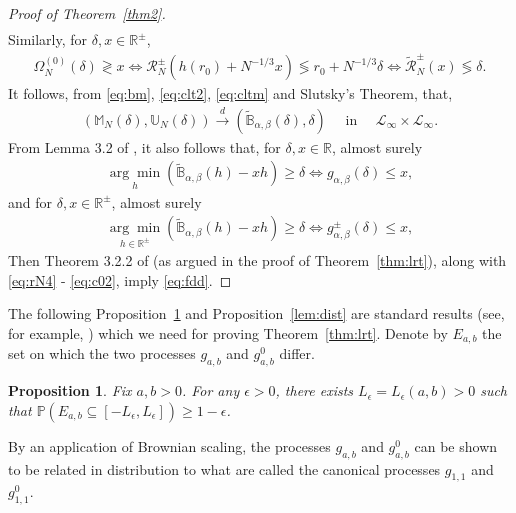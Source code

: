 \documentclass[12pt]{amsart}
\theoremstyle{plain}
\newtheorem{proposition}[theorem]{Proposition}
\theoremstyle{remark}
\numberwithin{equation}{section}
\begin{document}
\begin{proof}[Proof of Theorem~\ref{thm2}]
\begin{align}
\end{align}
Similarly, for $\delta, x \in \mathbb{R}^{\pm}$,
\begin{align}\label{eq:rN5}
    \Omega_{N}^{(0)}(\delta) \gtrless x \iff \mathcal{R}^{\pm}_N\left(h(r_0) + N^{-1/3}x\right) \lessgtr r_0 + N^{-1/3}\delta \iff \widetilde{\mathcal{R}}^{\pm}_N(x)\lessgtr \delta.
\end{align}
It follows, from \eqref{eq:bm}, \eqref{eq:clt2}, \eqref{eq:cltm} and Slutsky's Theorem,  that, 
\begin{align}\label{eq:c1}
    \left(\mathbb{M}_{N}(\delta), \mathbb{U}_{N}(\delta)\right) \stackrel{d}{\to} (\widetilde{\mathbb{B}}_{\alpha, \beta}(\delta), \delta) \quad \text { in } \quad \mathcal{L}_\infty \times \mathcal{L}_\infty.
\end{align}  
From Lemma 3.2 of \cite{MR3445293}, it also follows that, for $\delta, x \in \mathbb{R}$, almost surely
\begin{align}\label{eq:c01}
   \underset{h}{\operatorname{arg}\operatorname{min}} \left(\widetilde{\mathbb{B}}_{\alpha, \beta}(h) - xh\right) \geq \delta \iff g_{\alpha, \beta}(\delta) \leq x, 
\end{align}
and for $\delta, x \in \mathbb{R}^{\pm}$, almost surely
\begin{align}\label{eq:c02}
   \underset{h \in \mathbb{R}^{\pm}}{\operatorname{arg}\operatorname{min}} \left(\widetilde{\mathbb{B}}_{\alpha, \beta}(h) - xh\right) \geq \delta \iff g^{\pm}_{\alpha, \beta}(\delta) \leq x, 
\end{align}
Then Theorem 3.2.2 of \cite{MR1385671} (as argued in the proof of Theorem~\ref{thm:lrt}), along with \eqref{eq:rN4} - \eqref{eq:c02}, imply \eqref{eq:fdd}.
\end{proof}

The following Proposition~\ref{p1} and Proposition~\ref{lem:dist} are standard results (see, for example, \cite{banerjee2001likelihood}) which we need for proving Theorem~\ref{thm:lrt}. Denote by 
$E_{a,b}$ the set on which the two processes \(g_{a,b}\) and \(g^{0}_{a,b}\) differ. 

\begin{proposition}\label{p1}
Fix $a,b > 0$. For any $\epsilon > 0$, there exists $L_\epsilon  = L_\epsilon(a,b) > 0$ such that $\mathbb{P}\left(E_{a,b} \subseteq [-L_\epsilon,L_\epsilon]\right) \geq 1-\epsilon$.
\end{proposition}

By an application of Brownian scaling, the processes 
\(g_{a,b}\) and \(g^{0}_{a,b}\) can be shown to be related in distribution to what are called the canonical processes \(g_{1,1}\) and \(g^{0}_{1,1}\).
\end{document}
